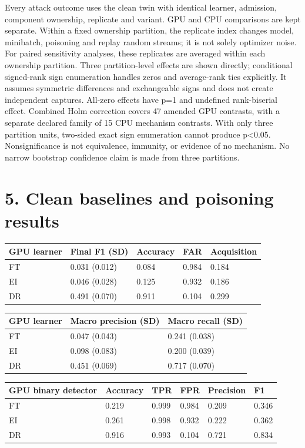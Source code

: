 \documentclass[
  10pt,
  a4paper,
]{article}
\begin{document}
Every attack outcome uses the clean twin with identical learner,
admission, component ownership, replicate and variant. GPU and CPU
comparisons are kept separate. Within a fixed ownership partition, the
replicate index changes model, minibatch, poisoning and replay random
streams; it is not solely optimizer noise. For paired sensitivity
analyses, these replicates are averaged within each ownership partition.
Three partition-level effects are shown directly; conditional
signed-rank sign enumeration handles zeros and average-rank ties
explicitly. It assumes symmetric differences and exchangeable signs and
does not create independent captures. All-zero effects have p=1 and
undefined rank-biserial effect. Combined Holm correction \cite{holm} covers
47 amended GPU contrasts, with a separate declared family of 15 CPU
mechanism contrasts. With only three partition units, two-sided exact
sign enumeration cannot produce p\textless0.05. Nonsignificance is not
equivalence, immunity, or evidence of no mechanism. No narrow bootstrap
confidence claim is made from three partitions.

\hypertarget{clean-baselines-and-poisoning-results}{%
\section{5. Clean baselines and poisoning
results}\label{clean-baselines-and-poisoning-results}}

\begin{longtable}[]{@{}lllll@{}}
\toprule
GPU learner & Final F1 (SD) & Accuracy & FAR & Acquisition \\
\midrule
\endhead
FT & 0.031 (0.012) & 0.084 & 0.984 & 0.184 \\
EI & 0.046 (0.028) & 0.125 & 0.932 & 0.186 \\
DR & 0.491 (0.070) & 0.911 & 0.104 & 0.299 \\
\bottomrule
\end{longtable}

\begin{longtable}[]{@{}lll@{}}
\toprule
GPU learner & Macro precision (SD) & Macro recall (SD) \\
\midrule
\endhead
FT & 0.047 (0.043) & 0.241 (0.038) \\
EI & 0.098 (0.083) & 0.200 (0.039) \\
DR & 0.451 (0.069) & 0.717 (0.070) \\
\bottomrule
\end{longtable}

\begin{longtable}[]{@{}llllll@{}}
\toprule
GPU binary detector & Accuracy & TPR & FPR & Precision & F1 \\
\midrule
\endhead
FT & 0.219 & 0.999 & 0.984 & 0.209 & 0.346 \\
EI & 0.261 & 0.998 & 0.932 & 0.222 & 0.362 \\
DR & 0.916 & 0.993 & 0.104 & 0.721 & 0.834 \\
\bottomrule
\end{longtable}
\end{document}
